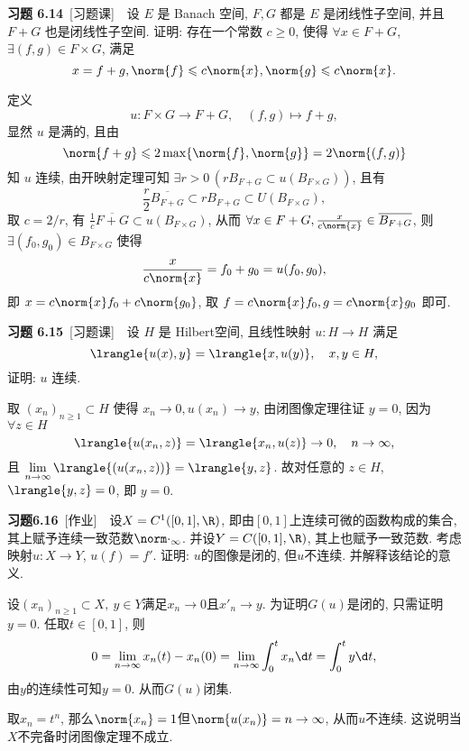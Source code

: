 	\textbf{习题 6.14}\ [习题课]\ \ 设 $ E $ 是 Banach 空间, $ F, G $ 都是 $ E $ 是闭线性子空间, 并且 $ F+G $ 也是闭线性子空间. 证明: 存在一个常数 $ c\geqslant0 $, 使得 $ \forall x\in F+G $, $ \exists(f, g)\in F\times G $, 满足
	\[
		x=f+g, \norm{f}\leqslant c\norm{x}, \norm{g}\leqslant c\norm{x}.
	\]
	\begin{answer}
		定义
		\[
			u:F\times G\to F+G,\quad (f, g)\mapsto f+g,
		\]
		显然 $ u $ 是满的, 且由 
		\[
			\norm{f+g}\leqslant 2\max\{ \norm{f}, \norm{g} \}=2\norm{(f, g)}
		\]
		知 $ u $ 连续, 由开映射定理可知 $ \exists r>0\,(rB_{F+G}\subset u(B_{F\times G})) $, 且有
		\[
			\frac{r}{2}\overline{B_{F+G}}\subset rB_{F+G}\subset U(B_{F\times G}),
		\]
		取 $ c=2/r $, 有 $ \frac{1}{c}\overline{F+G}\subset u(B_{F\times G}) $, 从而 $ \forall x\in F+G, \frac{x}{c\norm{x}}\in\overline{B_{F+G}} $, 则 $ \exists (f_{0}, g_{0})\in B_{F\times G} $ 使得
		\[
			\frac{x}{c\norm{x}}=f_{0}+g_{0}=u(f_{0}, g_{0}),
		\]
		即 $ x = c\norm{x}f_{0}+c\norm{g_{0}} $, 取 $ f=c\norm{x}f_{0} , g = c\norm{x}g_{0} $ 即可.\qedhere
	\end{answer}
	
	\textbf{习题 6.15}\ [习题课]\ \ 设 $ H $ 是 Hilbert空间, 且线性映射 $ u:H\to H $ 满足
	\[
		\lrangle{u(x), y}=\lrangle{x, u(y)}, \quad x, y\in H,
	\]
	证明: $ u $ 连续.
	\begin{answer}
		取 $ (x_{n})_{n\geqslant1}\subset H $ 使得 $ x_{n}\to 0, u(x_{n})\to y $, 由闭图像定理往证 $ y=0 $, 因为 $ \forall z\in H $
		\[
			\lrangle{u(x_{n}, z)}=\lrangle{x_{n}, u(z)}\to 0,\quad n\to \infty,
		\]
		且 $ \lim\limits_{n\to\infty}\lrangle{(u(x_{n}, z))}=\lrangle{y, z} $. 故对任意的 $ z\in H $, $ \lrangle{y, z}=0 $, 即 $ y=0 $.\qedhere
	\end{answer}
	
	\textbf{习题6.16}\ [作业]\ \ 设$ X=C^1([0,1],\R) $, 即由$ [0,1] $上连续可微的函数构成的集合, 其上赋予连续一致范数$ \norm\cdot_\infty $. 并设$ Y=C([0,1],\R) $, 其上也赋予一致范数. 考虑映射$ u : X\to Y $, $ u(f)=f' $. 证明: $ u $的图像是闭的, 但$ u $不连续. 并解释该结论的意义.
	\begin{answer}
	设$ (x_n)_{n\geqslant 1}\subset X,\ y\in Y $满足$ x_n\to 0 $且$ x'_n\to y $. 为证明$ G(u) $是闭的, 只需证明$ y=0 $. 任取$ t\in[0,1] $, 则
	\[
	0=\lim_{n\to\infty}x_n(t)-x_n(0)=\lim_{n\to\infty}\int_0^tx_n\d  t=\int_0^ty\d  t,
	\]
	由$ y $的连续性可知$ y=0 $. 从而$ G(u) $闭集.
	
	取$ x_n=t^n $, 那么$ \norm{x_n}=1 $但$ \norm{u(x_n)}=n\to\infty $, 从而$ u $不连续. 这说明当$ X $不完备时闭图像定理不成立.\qedhere
	\end{answer}

